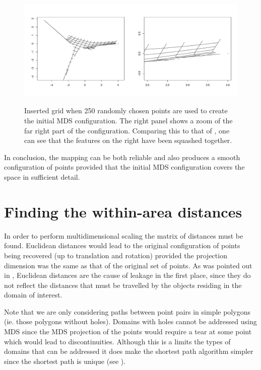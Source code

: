 \begin{figure}
\centering
\includegraphics[width=5in]{mds/figs/wt2-grid-samp.pdf} \\
\caption{Inserted grid when 250 randomly chosen points are used to create the initial MDS configuration. The right panel shows a zoom of the far right part of the configuration. Comparing this to that of , one can see that the features on the right have been squashed together.}
\label{wt2-grid-samp}
\end{figure}

In conclusion, the mapping can be both reliable and also produces a smooth configuration of points provided that the initial MDS configuration covers the space in sufficient detail.


\section{Finding the within-area distances}
\label{mdsdist}
In order to perform multidimensional scaling the matrix of distances must be found. Euclidean distances would lead to the original configuration of points being recovered (up to translation and rotation) provided the projection dimension was the same as that of the original set of points. As was pointed out in , Euclidean distances are the cause of leakage in the first place, since they do not reflect the distances that must be travelled by the objects residing in the domain of interest.

Note that we are only considering paths between point pairs in simple polygons (ie. those polygons without holes). Domains with holes cannot be addressed using MDS since the MDS projection of the points would require a tear at some point which would lead to discontinuities. Although this is a limits the types of domains that can be addressed it does make the shortest path algorithm simpler since the shortest path is unique (see ).

